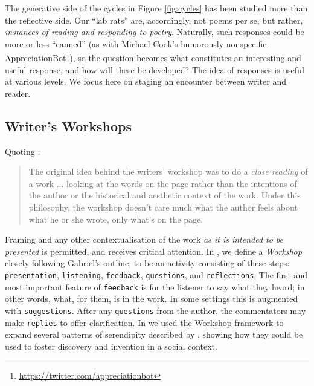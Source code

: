The generative side of the cycles in Figure \ref{fig:cycles} has been studied more than the reflective side.
Our ``lab rats'' are, accordingly, not poems per se, but rather,
\emph{instances of reading and responding to poetry}.  Naturally, such responses could be more or less
``canned'' (as with Michael Cook's humorously nonspecific
AppreciationBot\footnote{\url{https://twitter.com/appreciationbot}}), so the question becomes what constitutes an
interesting and useful response, and how will these be
developed?  The idea of responses is useful at various levels.
We focus here on staging an encounter between writer and reader.

\subsection{Writer's Workshops}

Quoting \cite[pp. 2--3]{gabriel2002writer}:

\begin{quote}
The original idea behind the writers' workshop was to do a \emph{close
  reading} of a work%
... looking at the words on the page rather than the
intentions of the author or the historical and aesthetic context of
the work.  Under this philosophy, the workshop doesn't care much what
the author feels about what he or she wrote, only what's on the page.
\end{quote}

Framing and any other contextualisation of the work \emph{as it is intended to be presented} is permitted, and receives critical attention.
In \cite{serendipity-arxiv}, 
we define a \emph{Workshop} closely following
Gabriel's outline, to be an activity consisting of these steps:
{\tt presentation}, {\tt listening}, {\tt feedback}, {\tt questions}, and 
 {\tt reflections}.  The first and most important feature of {\tt feedback} is
 for the listener to say what they heard; in other words, what, for them, is in the work.  In some
 settings this is augmented with {\tt suggestions}.  After any
 {\tt questions} from the author, the commentators may make {\tt replies} to offer clarification. 
In  \cite{serendipity-arxiv} we used the Workshop framework 
to expand several patterns of serendipity described by
\cite{van1994anatomy}, showing how they could be used to foster discovery
and invention in a social context.

